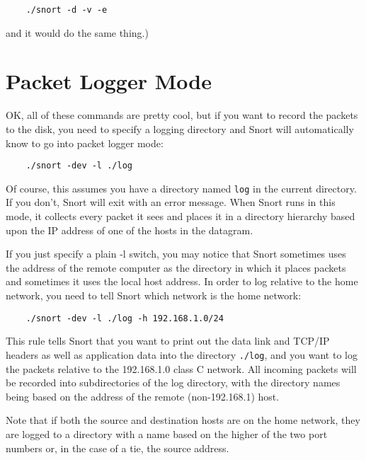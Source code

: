 \documentclass[english]{report}
\newenvironment{note}{
\samepage
    \vspace{10pt}{\textsf{
        {\hspace{7pt}\Huge{$\triangle$\hspace{-12.5pt}{\Large{$^!$}}}}\hspace{5pt}
        {\Large{NOTE}}
    }
    }
   \begin{center}
    \par\vspace{-17pt}

    \begin{lrbox}{\savepar}
    \begin{minipage}[r]{6in}
}
{
    \end{minipage}
    \end{lrbox}
    \fbox{
        \usebox{
            \savepar
	}
    }
    \par\vskip10pt
    \end{center}
}
\newenvironment{note}{
        \begin{rawhtml}
        <p><table border="1"><tr><td><b>
        Note:&nbsp;&nbsp;</b>
        \end{rawhtml}
}{
        \begin{rawhtml}
        </b></td></tr></table></p>
        \end{rawhtml}
}
\begin{document}
\begin{verbatim}
    ./snort -d -v -e
\end{verbatim}

and it would do the same thing.)

\section{Packet Logger Mode}

OK, all of these commands are pretty cool, but if you want to record the
packets to the disk, you need to specify a logging directory and Snort will
automatically know to go into packet logger mode:

\begin{verbatim}
    ./snort -dev -l ./log
\end{verbatim}

Of course, this assumes you have a directory named \verb!log!  in the current
directory. If you don't, Snort will exit with an error message. When Snort runs
in this mode, it collects every packet it sees and places it in a directory
hierarchy based upon the IP address of one of the hosts in the datagram.

If you just specify a plain -l switch, you may notice that Snort sometimes uses
the address of the remote computer as the directory in which it places packets
and sometimes it uses the local host address. In order to log relative to the
home network, you need to tell Snort which network is the home network:

\begin{verbatim}
    ./snort -dev -l ./log -h 192.168.1.0/24
\end{verbatim}

This rule tells Snort that you want to print out the data link and TCP/IP
headers as well as application data into the directory \verb!./log!, and you
want to log the packets relative to the 192.168.1.0 class C network. All
incoming packets will be recorded into subdirectories of the log directory,
with the directory names being based on the address of the remote
(non-192.168.1) host. 

\begin{note}

Note that if both the source and destination hosts are on the home network,
they are logged to a directory with a name based on the higher of the two port
numbers or, in the case of a tie, the source address.

\end{note}
\end{document}
